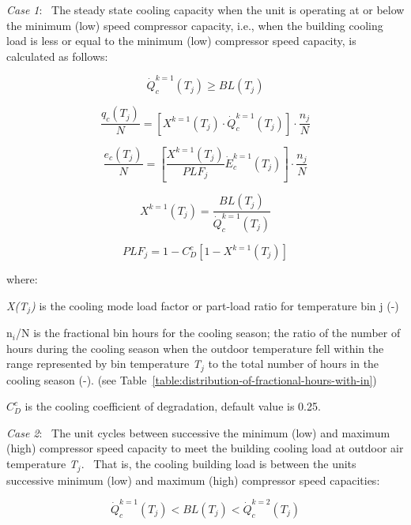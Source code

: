 \emph{Case 1}:~ The steady state cooling capacity when the unit is operating at or below the minimum (low) speed compressor capacity, i.e., when the building cooling load is less or equal to the minimum (low) compressor speed capacity, is calculated as follows:

\begin{equation}
\dot Q_c^{k = 1}({T_j}) \ge BL({T_j})
\end{equation}

\begin{equation}
\frac{{{q_c}({T_j})}}{N} = \left[ {{X^{k = 1}}({T_j}) \cdot \dot Q_c^{k = 1}({T_j})} \right] \cdot \frac{{{n_j}}}{N}
\end{equation}

\begin{equation}
\frac{{{e_c}({T_j})}}{N} = \left[ {\frac{{{X^{k = 1}}({T_j})}}{{PL{F_j}}}\dot E_c^{k = 1}({T_j})} \right] \cdot \frac{{{n_j}}}{N}
\end{equation}

\begin{equation}
{X^{k = 1}}({T_j}) = \frac{{BL({T_j})}}{{\dot Q_c^{k = 1}({T_j})}}
\end{equation}

\begin{equation}
PL{F_j} = 1 - C_D^c\left[ {1 - {X^{k = 1}}({T_j})} \right]
\end{equation}

where:

\emph{X(T\(_{j}\))} is the cooling mode load factor or part-load ratio for temperature bin j (-)

n\(_{i}\)/N is the fractional bin hours for the cooling season; the ratio of the number of hours during the cooling season when the outdoor temperature fell within the range represented by bin temperature \emph{T\(_{j}\)} to the total number of hours in the cooling season (-). (see Table~\ref{table:distribution-of-fractional-hours-with-in})

\(C_D^c\) is the cooling coefficient of degradation, default value is 0.25.

\emph{Case 2}:~ The unit cycles between successive the minimum (low) and maximum (high) compressor speed capacity to meet the building cooling load at outdoor air temperature \emph{T\(_{j}\)}.~ That is, the cooling building load is between the units successive minimum (low) and maximum (high) compressor speed capacities:

\begin{equation}
\dot Q_c^{k = 1}({T_j}) < BL({T_j}) < \dot Q_c^{k = 2}({T_j})
\end{equation}


